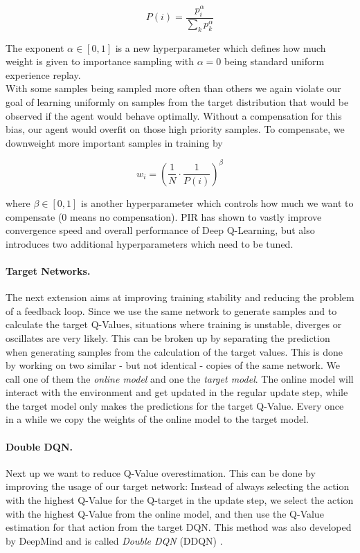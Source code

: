 \[P(i) = \frac{p_i^\alpha}{\sum_k p_k^\alpha}\]

The exponent $\alpha \in [0, 1]$ is a new hyperparameter which defines how much weight is given to importance sampling with $\alpha = 0$ being standard uniform experience replay.  \\
With some samples being sampled more often than others we again violate our goal of learning uniformly on samples from the target distribution that would be observed if the agent would behave optimally. Without a compensation for this bias, our agent would overfit on those high priority samples. To compensate, we downweight more important samples in training by 

\[w_i = \left(\frac{1}{N} \cdot \frac{1}{P(i)}\right)^\beta\]

where $\beta \in [0, 1]$ is another hyperparameter which controls how much we want to compensate (0 means no compensation). PIR has shown to vastly improve convergence speed and overall performance of Deep Q-Learning, but also introduces two additional hyperparameters which need to be tuned.

\paragraph{Target Networks.}
The next extension aims at improving training stability and reducing the problem of a feedback loop. Since we use the same network to generate samples and to calculate the target Q-Values, situations where training is unstable, diverges or oscillates are very likely. This can be broken up by separating the prediction when generating samples from the calculation of the target values. This is done by working on two similar - but not identical - copies of the same network. We call one of them the \textit{online model} and one the \textit{target model}. The online model will interact with the environment and get updated in the regular update step, while the target model only makes the predictions for the target Q-Value. Every once in a while we copy the weights of the online model to the target model.

\paragraph{Double DQN.}
Next up we want to reduce Q-Value overestimation. This can be done by improving the usage of our target network: Instead of always selecting the action with the highest Q-Value for the Q-target in the update step, we select the action with the highest Q-Value from the online model, and then use the Q-Value estimation for that action from the target DQN. This method was also developed by DeepMind and is called \textit{Double DQN} (DDQN) \cite{van2016deep}.


